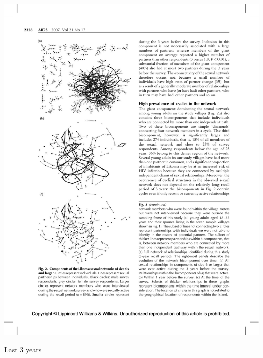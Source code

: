 \documentclass[aspectratio=169]{beamer}
\begin{document}
\begin{frame}

\begin{center}
\includegraphics[height = 0.75\textheight]{figures/helleringer_sexual_2007_fig2a}
\end{center}

\vfill

Last 3 years


\end{frame}
\end{document}
